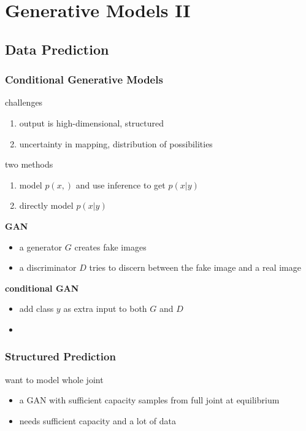 \documentclass[]{article}
\theoremstyle{definition}
\begin{document}
    \section{Generative Models II}%
    \label{sec:generative_models_ii}

    \subsection{Data Prediction}%
    \label{sub:data_prediction}

    \subsubsection{Conditional Generative Models}%
    \label{ssub:conditional_generative_models}

    challenges
    \begin{enumerate}
        \item output is high-dimensional, structured
        \item uncertainty in mapping, distribution of possibilities
    \end{enumerate}

    two methods
    \begin{enumerate}
        \item model $p(x,)$ and use inference to get $p(x|y)$
        \item directly model $p(x|y)$
    \end{enumerate}

    \textbf{GAN}
    \begin{itemize}
        \item a generator $G$ creates fake images
        \item a discriminator $D$ tries to discern between the fake image and a real image
    \end{itemize}
    \textbf{conditional GAN}
    \begin{itemize}
        \item add class $y$ as extra input to both $G$ and $D$
        \item
    \end{itemize}

    \subsubsection{Structured Prediction}%
    \label{ssub:structured_prediction}

    want to model whole joint
    \begin{itemize}
        \item a GAN with sufficient capacity samples from full joint at equilibrium
        \item needs sufficient capacity and a lot of data
    \end{itemize}
\end{document}
